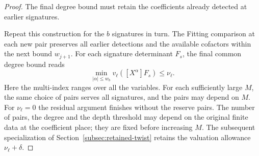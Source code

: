 \begin{proof}
The final degree bound must retain the coefficients already detected at earlier signatures.

Repeat this construction for the \(b\) signatures in turn.
The Fitting comparison at each new pair preserves all earlier
detections and the available cofactors within the next bound
\(w_{j+1}\). For each signature determinant \(F_s\), the final common degree bound reads
\[
 \min_{|\alpha|\le w_b} v_\ell([X^\alpha]F_s)\le\nu_\ell.
\]
Here the multi-index ranges over all the variables. For each sufficiently large
\(M\), the same choice of pairs serves all signatures, and the
pairs may depend on \(M\). For \(\nu_\ell=0\)
the residual argument finishes without the reserve pairs.
The number of pairs, the degree and the depth threshold may
depend on the original finite data at the coefficient place;
they are fixed before increasing \(M\). The subsequent
specialization of Section~\ref{subsec:retained-twist} retains
the valuation allowance \(\nu_\ell+\delta\).
\end{proof}

